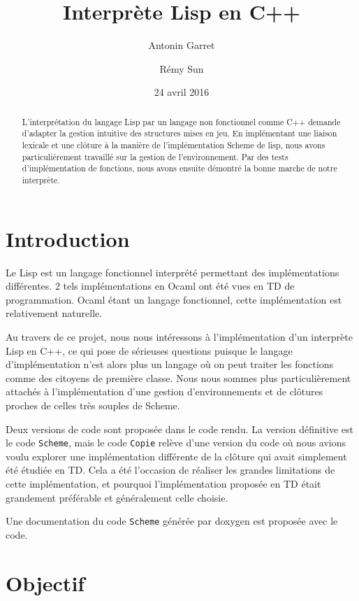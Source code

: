 \documentclass[a4paper,11pt]{article}
\title{Interprète Lisp en C++}
\author{Antonin Garret \and Rémy Sun}
\date{24 avril 2016}
\begin{document}
\maketitle

\begin{abstract}
  L'interprétation du langage Lisp par un langage non fonctionnel comme C++
  demande d'adapter la gestion intuitive des structures mises en jeu. En
  implémentant une liaison lexicale et une clôture à la manière de
  l'implémentation Scheme de lisp, nous avons particuliérement travaillé sur la
  gestion de l'environnement. Par
  des tests d'implémentation de fonctions, nous avons ensuite démontré la bonne
  marche de notre interprète.
\end{abstract}

\section*{Introduction}

Le Lisp est un langage fonctionnel interprété permettant des implémentations
différentes. 2 tels implémentations en Ocaml ont été vues en TD de
programmation. Ocaml étant un langage fonctionnel, cette implémentation est
relativement naturelle.

Au travers de ce projet, nous nous intéressons à l'implémentation d'un
interprète Lisp en C++, ce qui pose de sérieuses questions puisque le langage
d'implémentation n'est alors plus un langage où on peut traiter les fonctions
comme des citoyens de première classe. Nous nous sommes plus particulièrement attachés à
l'implémentation d'une gestion d'environnements et de clôtures proches de celles
très souples de Scheme. 

Deux versions de code sont proposée dans le code rendu. La version définitive
est le code \texttt{Scheme}, mais le code \texttt{Copie} relève d'une version du
code où nous avions voulu explorer une implémentation différente de la clôture
qui avait simplement été étudiée en TD. Cela a été l'occasion de réaliser les
grandes limitations de cette implémentation, et pourquoi l'implémentation
proposée en TD était grandement préférable et généralement celle choisie.

Une documentation du code \texttt{Scheme} générée par doxygen est proposée avec
le code.

\section{Objectif}
\end{document}
